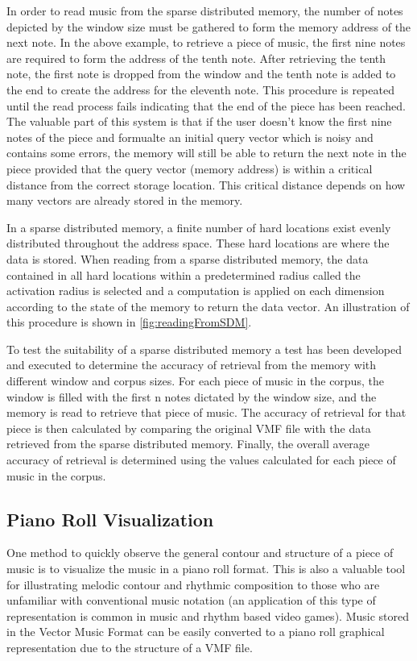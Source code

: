 In order to read music from the sparse distributed memory, the number of notes depicted by the window size must be gathered to form the memory address of the next note. In the above example, to retrieve a piece of music, the first nine notes are required to form the address of the tenth note. After retrieving the tenth note, the first note is dropped from the window and the tenth note is added to the end to create the address for the eleventh note. This procedure is repeated until the read process fails indicating that the end of the piece has been reached. The valuable part of this system is that if the user doesn't know the first nine notes of the piece and formualte an initial query vector which is noisy and contains some errors, the memory will still be able to return the next note in the piece provided that the query vector (memory address) is within a critical distance from the correct storage location. This critical distance depends on how many vectors are already stored in the memory.

In a sparse distributed memory, a finite number of hard locations exist evenly distributed throughout the address space. These hard locations are where the data is stored. When reading from a sparse distributed memory, the data contained in all hard locations within a predetermined radius called the activation radius is selected and a computation is applied on each dimension according to the state of the memory to return the data vector. An illustration of this procedure is shown in \ref{fig:readingFromSDM}.

To test the suitability of a sparse distributed memory a test has been developed and executed to determine the accuracy of retrieval from the memory with different window and corpus sizes. For each piece of music in the corpus, the window is filled with the first n notes dictated by the window size, and the memory is read to retrieve that piece of music. The accuracy of retrieval for that piece is then calculated by comparing the original VMF file with the data retrieved from the sparse distributed memory. Finally, the overall average accuracy of retrieval is determined using the values calculated for each piece of music in the corpus.

\subsection{Piano Roll Visualization}

One method to quickly observe the general contour and structure of a piece of music is to visualize the music in a piano roll format. This is also a valuable tool for illustrating melodic contour and rhythmic composition to those who are unfamiliar with conventional music notation (an application of this type of representation is common in music and rhythm based video games). Music stored in the Vector Music Format can be easily converted to a piano roll graphical representation due to the structure of a VMF file.

